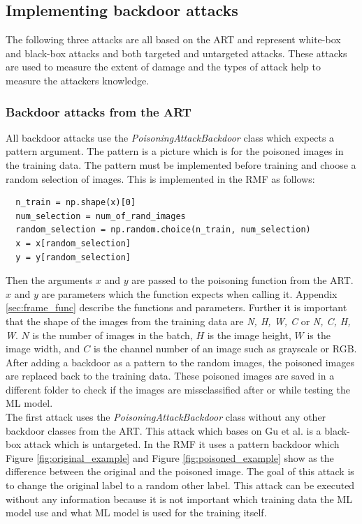 \subsection{Implementing backdoor attacks}

The following three attacks are all based on the ART and represent white-box and black-box attacks and both targeted and untargeted attacks. These attacks are used to measure the extent of damage and the types of attack help to measure the attackers knowledge.

\subsubsection*{Backdoor attacks from the ART}
\label{sec:backdoors_art}

All backdoor attacks use the \textit{PoisoningAttackBackdoor} class which expects a pattern argument. The pattern is a picture which is for the poisoned images in the training data. The pattern must be implemented before training and choose a random selection of images. This is implemented in the RMF as follows:

\begin{lstlisting}
  n_train = np.shape(x)[0]
  num_selection = num_of_rand_images
  random_selection = np.random.choice(n_train, num_selection)
  x = x[random_selection]
  y = y[random_selection]
\end{lstlisting}

Then the arguments $x$ and $y$ are passed to the poisoning function from the ART. $x$ and $y$ are parameters which the function expects when calling it. Appendix \ref{sec:frame_func} describe the functions and parameters. Further it is important that the shape of the images from the training data are \textit{N, H, W, C} or \textit{N, C, H, W}. $N$ is the number of images in the batch, $H$ is the image height, $W$ is the image width, and $C$ is the channel number of an image such as grayscale or RGB. After adding a backdoor as a pattern to the random images, the poisoned images are replaced back to the training data. These poisoned images are saved in a different folder to check if the images are missclassified after or while testing the ML model.\\

The first attack uses the \textit{PoisoningAttackBackdoor} class without any other backdoor classes from the ART. This attack which bases on Gu et al. \cite{DBLP:journals/corr/abs-1708-06733} is a black-box attack which is untargeted. In the RMF it uses a pattern backdoor which Figure \ref{fig:original_example} and Figure \ref{fig:poisoned_example} show as the difference between the original and the poisoned image. The goal of this attack is to change the original label to a random other label. This attack can be executed without any information because it is not important which training data the ML model use and what ML model is used for the training itself.

